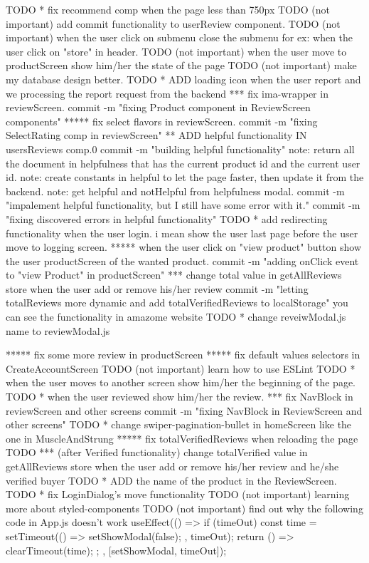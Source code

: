 {TODO * fix recommend comp when the page less than 750px
TODO (not important) add commit functionality to userReview component.
TODO (not important) when the user click on submenu close the submenu for ex: when the user click on "store" in header.
TODO (not important) when the user move to productScreen show him/her the state of the page
TODO (not important) make my database design better.
TODO * ADD loading icon when the user report and we processing the report request from the backend
*** fix ima-wrapper in reviewScreen.
    commit -m "fixing Product component in ReviewScreen components"
***** fix select flavors in reviewScreen.
    commit -m "fixing SelectRating comp in reviewScreen"
** ADD helpful functionality IN usersReviews comp.0
        commit -m "building helpful functionality"
        note: return all the document in helpfulness that has the current product id and the current user id.
        note: create constants in helpful to let the page faster, then update it from the backend.
        note: get helpful and notHelpful from helpfulness modal.
        commit -m "impalement helpful functionality, but I still have some error with it."
        commit -m "fixing discovered errors in helpful functionality"
TODO * add redirecting functionality when the user login. i mean show the user last page before the user move to logging screen.
***** when the user click on "view product" button show the user productScreen of the wanted product.
      commit -m "adding onClick event to "view Product" in productScreen"
*** change total value in getAllReviews store when the user add or remove his/her review
    commit -m "letting totalReviews more dynamic and add totalVerifiedReviews to localStorage"
      you can see the functionality in amazome website
TODO * change reveiwModal.js name to reviewModal.js

***** fix some more review in productScreen
***** fix default values selectors in CreateAccountScreen 
TODO (not important) learn how to use ESLint
TODO * when the user moves to another screen show him/her the beginning of the page.
TODO * when the user reviewed show him/her the review.
*** fix NavBlock in reviewScreen and other screens
      commit -m "fixing NavBlock in ReviewScreen and other screens"
TODO * change swiper-pagination-bullet in homeScreen like the one in MuscleAndStrung
***** fix totalVerifiedReviews when reloading the page
TODO *** (after Verified functionality) change totalVerified value in getAllReviews store when the user add or remove his/her review and he/she verified buyer
TODO * ADD the name of the product in the ReviewScreen.
TODO * fix  LoginDialog's move functionality 
TODO (not important) learning more about styled-components
TODO (not important) find out why the following code in App.js doesn't work
     useEffect(() => {
    if (timeOut) {
      const time = setTimeout(() => {
        setShowModal(false);
      }, timeOut);
      return () => {
        clearTimeout(time);
      };
    }
  }, [setShowModal, timeOut]);

}
